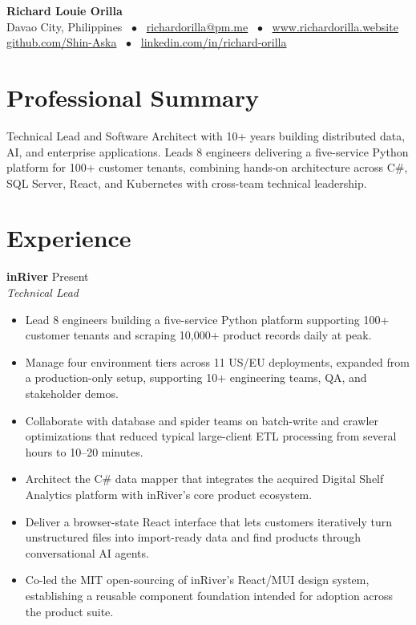 \documentclass[11pt,letterpaper]{article}
\begin{document}
\pagestyle{empty}

\begin{center}
    {\LARGE \bfseries Richard Louie Orilla} \\
    \vspace{4pt}
    Davao City, Philippines \ $\bullet$ \ \href{mailto:richardorilla@pm.me}{richardorilla@pm.me} \ $\bullet$ \ \href{http://www.richardorilla.website}{www.richardorilla.website} \\
    \href{https://github.com/Shin-Aska}{github.com/Shin-Aska} \ $\bullet$ \ \href{https://www.linkedin.com/in/richard-orilla/}{linkedin.com/in/richard-orilla}
\end{center}

\vspace{6pt}

\section{Professional Summary}
\noindent
Technical Lead and Software Architect with 10+ years building distributed data, AI, and enterprise applications. Leads 8 engineers delivering a five-service Python platform for 100+ customer tenants, combining hands-on architecture across C\#, SQL Server, React, and Kubernetes with cross-team technical leadership.

\section{Experience}

\noindent
\textbf{inRiver} \hfill Present \\
\textit{Technical Lead}
\begin{itemize}
    \item Lead 8 engineers building a five-service Python platform supporting 100+ customer tenants and scraping 10,000+ product records daily at peak.
    \item Manage four environment tiers across 11 US/EU deployments, expanded from a production-only setup, supporting 10+ engineering teams, QA, and stakeholder demos.
    \item Collaborate with database and spider teams on batch-write and crawler optimizations that reduced typical large-client ETL processing from several hours to 10--20 minutes.
    \item Architect the C\# data mapper that integrates the acquired Digital Shelf Analytics platform with inRiver's core product ecosystem.
    \item Deliver a browser-state React interface that lets customers iteratively turn unstructured files into import-ready data and find products through conversational AI agents.
    \item Co-led the MIT open-sourcing of inRiver's React/MUI design system, establishing a reusable component foundation intended for adoption across the product suite.
\end{itemize}
\end{document}
